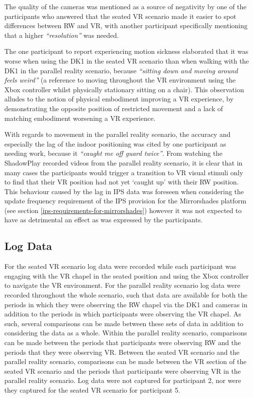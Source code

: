 The quality of the cameras was mentioned as a source of negativity by one of the participants who answered that the seated VR scenario made it easier to spot differences between RW and VR, with another participant specifically mentioning that a higher \textit{``resolution''} was needed.

The one participant to report experiencing motion sickness elaborated that it was worse when using the DK1 in the seated VR scenario than when walking with the DK1 in the parallel reality scenario, because \textit{``sitting down and moving around feels weird''} (a reference to moving throughout the VR environment using the Xbox controller whilst physically stationary sitting on a chair). This observation alludes to the notion of physical embodiment improving a VR experience, by demonstrating the opposite position of restricted movement and a lack of matching embodiment worsening a VR experience.

With regards to movement in the parallel reality scenario, the accuracy and especially the lag of the indoor positioning was cited by one participant as needing work, because it \textit{``caught me off guard twice''}. From watching the ShadowPlay recorded videos from the parallel reality scenario, it is clear that in many cases the participants would trigger a transition to VR visual stimuli only to find that their VR position had not yet `caught up' with their RW position. This behaviour caused by the lag in IPS data was foreseen when considering the update frequency requirement of the IPS provision for the Mirrorshades platform (see section \ref{ips-requirements-for-mirrorshades}) however it was not expected to have as detrimental an effect as was expressed by the participants.


\subsection{Log Data}

For the seated VR scenario log data were recorded while each participant was engaging with the VR chapel in the seated position and using the Xbox controller to navigate the VR environment. For the parallel reality scenario log data were recorded throughout the whole scenario, such that data are available for both the periods in which they were observing the RW chapel via the DK1 and cameras in addition to the periods in which participants were observing the VR chapel. As such, several comparisons can be made between these sets of data in addition to considering the data as a whole. Within the parallel reality scenario, comparisons can be made between the periods that participants were observing RW and the periods that they were observing VR. Between the seated VR scenario and the parallel reality scenario, comparisons can be made between the VR section of the seated VR scenario and the periods that participants were observing VR in the parallel reality scenario. Log data were not captured for participant 2, nor were they captured for the seated VR scenario for participant 5.

